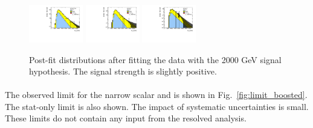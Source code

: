 \begin{figure}[htbp!]
\begin{center}
\includegraphics[width=0.21\textwidth,angle=-90]{figures/boosted/results/postfitplot_s_2000_b2b.pdf} 
\includegraphics[width=0.21\textwidth,angle=-90]{figures/boosted/results/postfitplot_s_2000_b3b.pdf} 
\includegraphics[width=0.21\textwidth,angle=-90]{figures/boosted/results/postfitplot_s_2000_b4b.pdf} 
\caption{Post-fit distributions after fitting the data with the 2000 GeV signal hypothesis. The signal strength is slightly positive.}
\label{fig:postfit2000}
\end{center}
\end{figure}

\paragraph{}
The observed limit for the narrow scalar and \Grav is shown in Fig.~\ref{fig:limit_boosted}.
The stat-only limit is also shown. The impact of systematic uncertainties is small. 
These limits do not contain any input from the resolved analysis.

